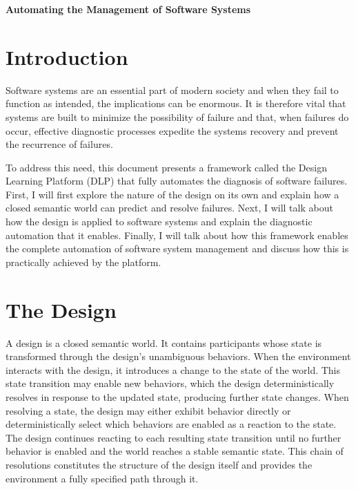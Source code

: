 \documentclass{article}
\begin{document}
\begin{titlepage}
    \centering
    \vspace*{\fill}

    {\Huge\bfseries Automating the Management of Software Systems\par}

     \vspace{1cm}

    \vspace*{\fill}
\end{titlepage}


\section{Introduction}
Software systems are an essential part of modern society and when they fail to function as intended, the implications can be enormous. It is therefore vital that systems are built to minimize the possibility of failure and that, when failures do occur, effective diagnostic processes expedite the systems recovery and prevent the recurrence of failures.

To address this need, this document presents a framework called the Design Learning Platform (DLP) that fully automates the diagnosis of software failures. First, I will first explore the nature of the design on its own and explain how a closed semantic world can predict and resolve failures. Next, I will talk about how the design is applied to software systems and explain the diagnostic automation that it enables. Finally, I will talk about how this framework enables the complete automation of software system management and discuss how this is practically achieved by the platform.

\section{The Design}

A design is a closed semantic world. It contains participants whose state is transformed through the design's unambiguous behaviors. When the environment interacts with the design, it introduces a change to the state of the world. This state transition may enable new behaviors, which the design deterministically resolves in response to the updated state, producing further state changes. When resolving a state, the design may either exhibit behavior directly or deterministically select which behaviors are enabled as a reaction to the state. The design continues reacting to each resulting state transition until no further behavior is enabled and the world reaches a stable semantic state. This chain of resolutions constitutes the structure of the design itself and provides the environment a fully specified path through it.
\end{document}
